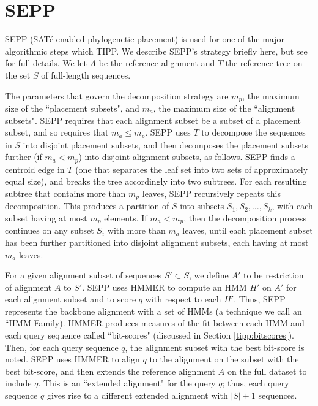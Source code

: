 \makeatletter 
\renewcommand{\thefigure}{A\@arabic\c@figure} 
\makeatletter 
\renewcommand{\thetable}{A\@arabic\c@table} 
\makeatletter 
\renewcommand{\thesection}{A\@arabic\c@section} 
\newpage
\section{SEPP}
SEPP (SAT\'e-enabled phylogenetic
placement)  is used for one of 
the  major algorithmic
steps which TIPP.
We describe SEPP's strategy briefly here, but
see \cite{Mirarab2012} for full details.
We let $A$ be
the  reference alignment and $T$ the reference tree on the set $S$ of 
full-length sequences.

The parameters that govern the decomposition strategy are
$m_p$, the maximum size of the ``placement subsets", and
$m_a$, the maximum size of the ``alignment subsets".
SEPP requires that each alignment subset be a subset of
a placement subset, and so requires that $m_a \leq m_p$.
SEPP uses $T$ to
decompose the sequences in $S$ into 
disjoint placement subsets, and then decomposes
the placement subsets further (if $m_a < m_p$) into
disjoint alignment subsets, as follows.
SEPP finds a centroid edge in $T$ (one that
separates the leaf set into two sets of
approximately equal size), and breaks the tree accordingly into two subtrees.
For each resulting subtree that contains more than $m_p$ leaves, 
SEPP recursively repeats this decomposition.
This produces a partition of $S$  into subsets $S_1, S_2, \ldots, S_k$,
with each subset having at most $m_p$ elements.
If $m_a < m_p$, then the decomposition
process continues on any subset $S_i$ with more than $m_a$ leaves,
until each placement subset has been further partitioned into
disjoint
alignment subsets, each having at most $m_a$ leaves. 


For a given alignment subset of sequences $S' \subset S$, 
we define $A'$ to be restriction of alignment $A$ to $S'$.
SEPP uses HMMER to compute an HMM $H'$ on $A'$ for each alignment subset
and to score $q$ with respect to each $H'$.
Thus, SEPP represents the backbone alignment with a set of
HMMs (a technique we call an ``HMM
Family).
HMMER produces measures of the fit between
each HMM and each query sequence called ``bit-scores" (discussed in
Section \ref{tipp:bitscores}).
Then,  for each query sequence $q$, the alignment
subset with the best bit-score is noted.
SEPP uses HMMER to align $q$ to the alignment
on the subset with the best bit-score, and
then extends the reference alignment $A$ on the full dataset to include $q$.
This is an ``extended alignment" for the query $q$;
thus, each query sequence $q$ gives rise to a different extended
alignment with $|S|+1$ sequences.


